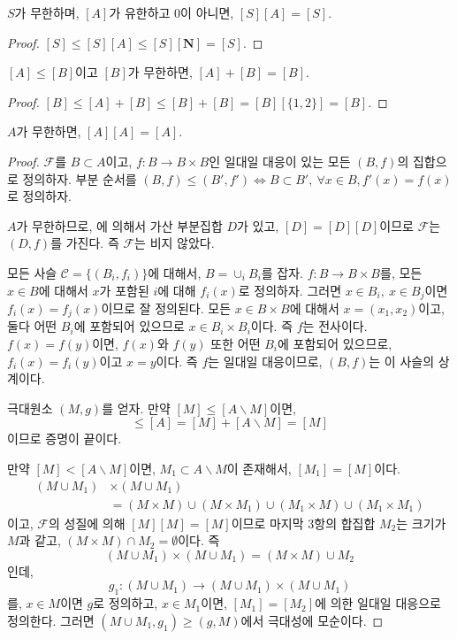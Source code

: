 \begin{corollary}
	$S$가 무한하며, $[A]$가 유한하고 $0$이 아니면, $[S][A] = [S]$.
\end{corollary}
\begin{proof}
	$[S] \leq [S][A] \leq [S][\mathbf{N}] = [S]$.
\end{proof}
\begin{corollary}
	$[A] \leq [B]$이고 $[B]$가 무한하면, $[A] + [B] = [B]$.
\end{corollary}
\begin{proof}
	$[B] \leq [A] + [B] \leq [B] + [B] = [B][\{1, 2\}] = [B]$.
\end{proof}
\begin{theorem}
	$A$가 무한하면, $[A][A] = [A]$.
\end{theorem}
\begin{proof}
	$\mathscr{F}$를 $B \subset A$이고, $f : B \to B \times B$인 일대일 대응이 있는 모든 $(B, f)$의 집합으로 정의하자.
	부분 순서를 $(B, f) \leq (B', f') \iff B \subset B',\: \forall x \in B, f'(x) = f(x)$로 정의하자.

	$A$가 무한하므로, 에 의해서 가산 부분집합 $D$가 있고, $[D] = [D][D]$이므로 $\mathscr{F}$는 $(D, f)$를 가진다.
	즉 $\mathscr{F}$는 비지 않았다.

	모든 사슬 $\mathscr{C} = \{(B_i, f_i)\}$에 대해서, $B = \cup_i B_i$를 잡자.
	$f : B \to B \times B$를, 모든 $x \in B$에 대해서 $x$가 포함된 $i$에 대해 $f_i(x)$로 정의하자.
	그러면 $x \in B_i,\: x \in B_j$이면 $f_i(x) = f_j(x)$이므로 잘 정의된다.
	모든 $x \in B \times B$에 대해서 $x = (x_1, x_2)$이고, 둘다 어떤 $B_i$에 포함되어 있으므로 $x \in B_i \times B_i$이다.
	즉 $f$는 전사이다.
	$f(x) = f(y)$이면, $f(x)$와 $f(y)$ 또한 어떤 $B_i$에 포함되어 있으므로, $f_i(x) = f_i(y)$이고 $x = y$이다.
	즉 $f$는 일대일 대응이므로, $(B, f)$는 이 사슬의 상계이다.

	극대원소 $(M, g)$를 얻자.
	만약 $[M] \leq [A \backslash M]$이면, 
	\begin{equation}
		[M] \leq [A] = [M] + [A \backslash M] = [M]
	\end{equation}
	이므로 증명이 끝이다.

	만약 $[M] < [A \backslash M]$이면, $M_1 \subset A \backslash M$이 존재해서, $[M_1] = [M]$이다.
	\begin{align}
		(M \cup M_1) & \times (M \cup M_1) \\
		&= (M \times M) \cup (M \times M_1) \cup (M_1 \times M) \cup (M_1 \times M_1)
	\end{align}
	이고, $\mathscr{F}$의 성질에 의해 $[M][M] = [M]$이므로 마지막 $3$항의 합집합 $M_2$는 크기가 $M$과 같고, $(M \times M) \cap M_2 = \emptyset$이다.
	즉
	\begin{equation}
		(M \cup M_1) \times (M \cup M_1) = (M \times M) \cup M_2
	\end{equation}
	인데,
	\begin{equation}
		g_1 : (M \cup M_1) \to (M \cup M_1) \times (M \cup M_1)
	\end{equation}
	를, $x \in M$이면 $g$로 정의하고, $x \in M_1$이면, $[M_1] = [M_2]$에 의한 일대일 대응으로 정의한다.
	그러면 $(M \cup M_1, g_1) \geq (g, M)$에서 극대성에 모순이다.
\end{proof}
